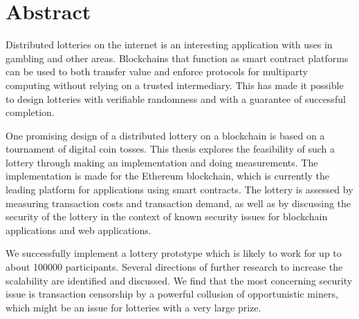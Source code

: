\chapter*{Abstract}

Distributed lotteries on the internet is an interesting application with uses in gambling and other areas. Blockchains that function as smart contract platforms can be used to both transfer value and enforce protocols for multiparty computing without relying on a trusted intermediary. This has made it possible to design lotteries with verifiable randomness and with a guarantee of successful completion. 

One promising design of a distributed lottery on a blockchain is based on a tournament of digital coin tosses. This thesis explores the feasibility of such a lottery through making an implementation and doing measurements. The implementation is made for the Ethereum blockchain, which is currently the leading platform for applications using smart contracts. The lottery is assessed by measuring transaction costs and transaction demand, as well as by discussing the security of the lottery in the context of known security issues for blockchain applications and web applications.

We successfully implement a lottery prototype which is likely to work for up to about 100000 participants. Several directions of further research to increase the scalability are identified and discussed. We find that the most concerning security issue is transaction censorship by a powerful collusion of opportunistic miners, which might be an issue for lotteries with a very large prize.

\hypersetup{pageanchor=false}